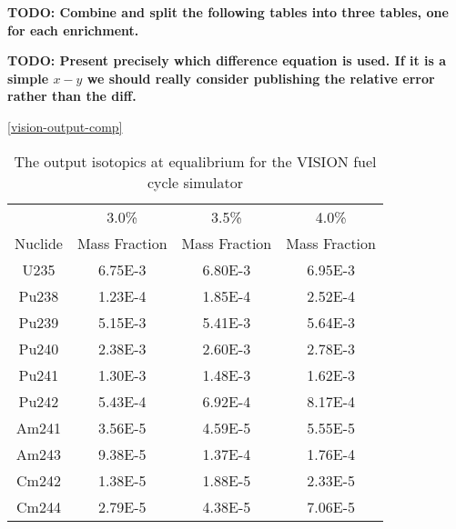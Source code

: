 \documentclass{article}
\newcommand{\TODO}[1] {{\color{red}\textbf{TODO: #1}}}
\begin{document}
\TODO{Combine and split the following tables into three tables, one for each enrichment.}

\TODO{Present precisely which difference equation is used. If it is a simple $x-y$ we
should really consider publishing the relative error rather than the diff.}

\begin{table}[!htb]
\ref{vision-output-comp}
\centering
\small
\caption{The output isotopics at equalibrium for the VISION fuel cycle simulator}
\label{tab:a}
\vspace{0.5em}
\begin{tabular}{cccc}
 & \multicolumn{1}{c}{3.0\%} & \multicolumn{1}{c}{3.5\%} & \multicolumn{1}{c}{4.0\%} \\
Nuclide & Mass Fraction & Mass Fraction & Mass Fraction \\
\hline
U235  & 6.75E-3 & 6.80E-3 & 6.95E-3 \\
Pu238 & 1.23E-4 & 1.85E-4 & 2.52E-4 \\
Pu239 & 5.15E-3 & 5.41E-3 & 5.64E-3 \\
Pu240 & 2.38E-3 & 2.60E-3 & 2.78E-3 \\
Pu241 & 1.30E-3 & 1.48E-3 & 1.62E-3 \\
Pu242 & 5.43E-4 & 6.92E-4 & 8.17E-4 \\
Am241 & 3.56E-5 & 4.59E-5 & 5.55E-5 \\
Am243 & 9.38E-5 & 1.37E-4 & 1.76E-4 \\
Cm242 & 1.38E-5 & 1.88E-5 & 2.33E-5 \\
Cm244 & 2.79E-5 & 4.38E-5 & 7.06E-5 \\
\hline
\end{tabular}
\end{table}
\end{document}

